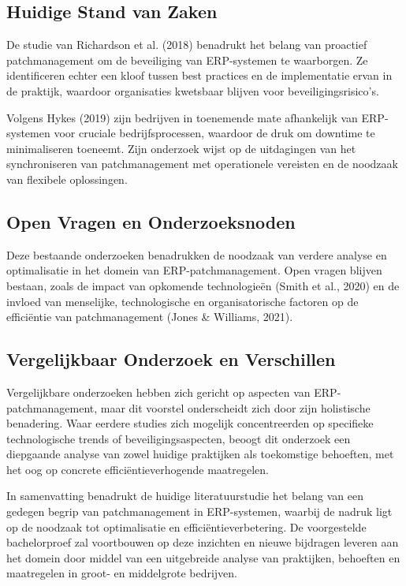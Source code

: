 \subsection{Huidige Stand van Zaken}

De studie van Richardson et al. (2018) benadrukt het belang van proactief patchmanagement om de beveiliging van ERP-systemen te waarborgen. Ze identificeren echter een kloof tussen best practices en de implementatie ervan in de praktijk, waardoor organisaties kwetsbaar blijven voor beveiligingsrisico's.

Volgens Hykes (2019) zijn bedrijven in toenemende mate afhankelijk van ERP-systemen voor cruciale bedrijfsprocessen, waardoor de druk om downtime te minimaliseren toeneemt. Zijn onderzoek wijst op de uitdagingen van het synchroniseren van patchmanagement met operationele vereisten en de noodzaak van flexibele oplossingen.

\subsection{Open Vragen en Onderzoeksnoden}

Deze bestaande onderzoeken benadrukken de noodzaak van verdere analyse en optimalisatie in het domein van ERP-patchmanagement. Open vragen blijven bestaan, zoals de impact van opkomende technologieën (Smith et al., 2020) en de invloed van menselijke, technologische en organisatorische factoren op de efficiëntie van patchmanagement (Jones \& Williams, 2021).

\subsection{Vergelijkbaar Onderzoek en Verschillen}

Vergelijkbare onderzoeken hebben zich gericht op aspecten van ERP-patchmanagement, maar dit voorstel onderscheidt zich door zijn holistische benadering. Waar eerdere studies zich mogelijk concentreerden op specifieke technologische trends of beveiligingsaspecten, beoogt dit onderzoek een diepgaande analyse van zowel huidige praktijken als toekomstige behoeften, met het oog op concrete efficiëntieverhogende maatregelen.

In samenvatting benadrukt de huidige literatuurstudie het belang van een gedegen begrip van patchmanagement in ERP-systemen, waarbij de nadruk ligt op de noodzaak tot optimalisatie en efficiëntieverbetering. De voorgestelde bachelorproef zal voortbouwen op deze inzichten en nieuwe bijdragen leveren aan het domein door middel van een uitgebreide analyse van praktijken, behoeften en maatregelen in groot- en middelgrote bedrijven.

